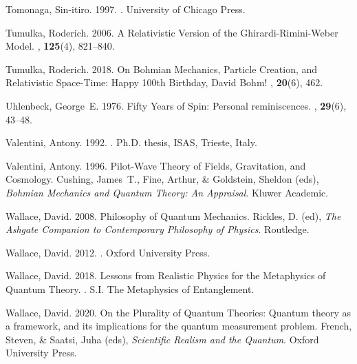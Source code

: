 \documentclass[onecolumn,secnumarabic,amsmath,amssymb,balancelastpage,nofootinbib]{article}
\begin{document}
\begin{thebibliography}{}
Tomonaga, Sin-itiro. 1997.
.
\newblock University of Chicago Press.

Tumulka, Roderich. 2006.
\newblock A Relativistic Version of the Ghirardi-Rimini-Weber Model.
, {\bf 125}(4), 821--840.

Tumulka, Roderich. 2018.
\newblock On Bohmian Mechanics, Particle Creation, and Relativistic Space-Time:
  Happy 100th Birthday, David Bohm!
, {\bf 20}(6), 462.

Uhlenbeck, George~E. 1976.
\newblock Fifty Years of Spin: Personal reminiscences.
, {\bf 29}(6), 43--48.

Valentini, Antony. 1992.
.
\newblock Ph.D. thesis, ISAS, Trieste, Italy.

Valentini, Antony. 1996.
\newblock Pilot-Wave Theory of Fields, Gravitation, and Cosmology.
 Cushing, James~T., Fine, Arthur, \&
  Goldstein, Sheldon (eds), {\em Bohmian Mechanics and Quantum Theory: An
  Appraisal}.
\newblock Kluwer Academic.

Wallace, David. 2008.
\newblock Philosophy of Quantum Mechanics.
 Rickles, D. (ed), {\em The Ashgate Companion
  to Contemporary Philosophy of Physics}.
\newblock Routledge.

Wallace, David. 2012.
.
\newblock Oxford University Press.

Wallace, David. 2018.
\newblock Lessons from Realistic Physics for the Metaphysics of Quantum Theory.
.
\newblock S.I. The Metaphysics of Entanglement.

Wallace, David. 2020.
\newblock On the Plurality of Quantum Theories: Quantum theory as a framework,
  and its implications for the quantum measurement problem.
 French, Steven, \& Saatsi, Juha (eds), {\em Scientific
  Realism and the Quantum}.
\newblock Oxford University Press.


\end{thebibliography}
\end{document}
